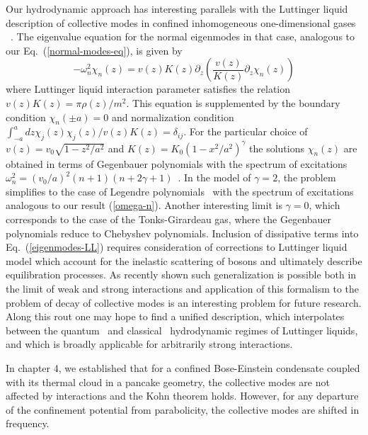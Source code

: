 Our hydrodynamic approach has interesting parallels with the Luttinger liquid description of collective modes in confined inhomogeneous one-dimensional gases ~\cite{Citro}. The eigenvalue equation for the normal eigenmodes in that case, analogous to our Eq.~(\ref{normal-modes-eq}), is given by  
\begin{equation}\label{eigenmodes-LL}
-\omega^2_n\chi_n(z)=v(z)K(z)\partial_z\left(\frac{v(z)}{K(z)}\partial_z\chi_n(z)\right)
\end{equation}
where Luttinger liquid interaction parameter satisfies the relation\\ $v(z)K(z)=\pi \rho(z)/m^2$. This equation is supplemented by the boundary condition $\chi_n(\pm a)=0$ and normalization condition $\int^{a}_{-a} dz \chi_j(z)\chi_j(z)/v(z)K(z)=\delta_{ij}$. For the particular choice of $v(z)=v_0\sqrt{1-z^2/a^2}$ and $K(z)=K_0(1-x^2/a^2)^\gamma$ the solutions $\chi_n(z)$ are obtained in terms of Gegenbauer polynomials with the spectrum of excitations $\omega^2_n=(v_0/a)^2(n+1)(n+2\gamma+1)$~\cite{Citro,Petrov1,Stringari}. In the model of $\gamma=2$, the problem simplifies to the case of Legendre polynomials~\cite{Petrov2} with the spectrum of excitations analogous to our result (\ref{omega-n}). Another interesting limit is $\gamma=0$, which corresponds to the case of the Tonks-Girardeau gas, where the Gegenbauer polynomials reduce to Chebyshev polynomials. Inclusion of dissipative terms into Eq.~(\ref{eigenmodes-LL}) requires consideration of corrections to Luttinger liquid model which account for the inelastic scattering of bosons and ultimately describe equilibration processes. As recently shown such generalization is possible both in the limit of weak \cite{AL} and strong \cite{Matveev} interactions and application of this formalism to the problem of decay of collective modes is an interesting problem for future research. Along this rout one may hope to find a unified description, which interpolates between the quantum~\cite{Matveev} and classical~\cite{Andreev} hydrodynamic regimes of Luttinger liquids, and which is broadly applicable for arbitrarily strong interactions.  

In chapter 4, we established that for a confined Bose-Einstein condensate coupled with its thermal cloud in a pancake geometry, the collective modes are not affected by interactions and the Kohn theorem holds. However, for any departure of the confinement potential from parabolicity, the collective modes are shifted in frequency.

